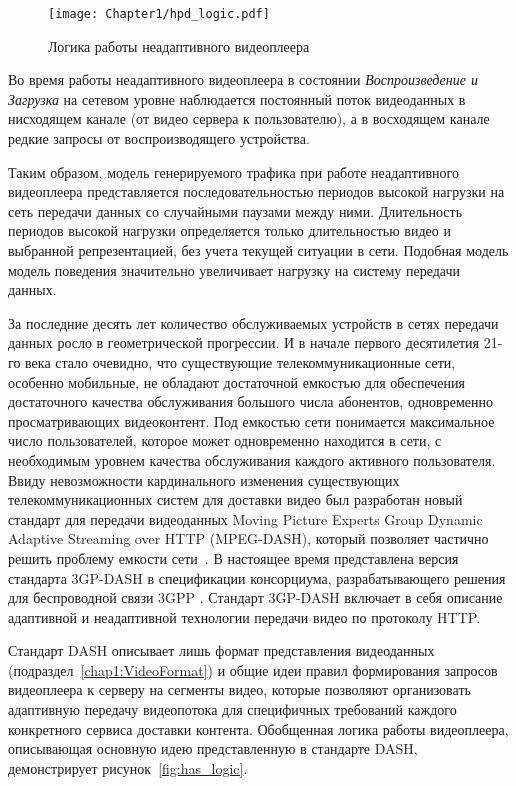 \begin{figure}[htbp]
\begin{center}
\texttt{[image: Chapter1/hpd\_logic.pdf]}
\caption{Логика работы неадаптивного видеоплеера}
\label{fig:hpd_logic}
\end{center}
\end{figure}

Во время работы неадаптивного видеоплеера в состоянии \textit{Воспроизведение и Загрузка} на сетевом уровне наблюдается постоянный поток видеоданных в нисходящем канале (от видео сервера к пользователю), а в восходящем канале редкие запросы от воспроизводящего устройства.

Таким образом, модель генерируемого трафика при работе неадаптивного видеоплеера представляется последовательностью периодов высокой нагрузки на сеть передачи данных со случайными паузами между ними. Длительность периодов высокой нагрузки определяется только длительностью видео и выбранной репрезентацией, без учета текущей ситуации в сети. Подобная модель модель поведения значительно увеличивает нагрузку на систему передачи данных.

За последние десять лет количество обслуживаемых устройств в сетях передачи данных росло в геометрической прогрессии. И в начале первого десятилетия 21-го века стало очевидно, что существующие телекоммуникационные сети, особенно мобильные, не обладают достаточной емкостью для обеспечения достаточного качества обслуживания большого числа абонентов, одновременно просматривающих видеоконтент. Под емкостью сети понимается максимальное число пользователей, которое может одновременно находится в сети, с необходимым уровнем качества обслуживания каждого активного пользователя. Ввиду невозможности кардинального изменения существующих телекоммуникационных систем для доставки видео был разработан новый стандарт для передачи видеоданных Moving Picture Experts Group Dynamic Adaptive Streaming over HTTP (MPEG-DASH), который позволяет частично решить проблему емкости сети~\cite{dash_standard}. В настоящее время представлена версия стандарта 3GP-DASH в спецификации консорциума, разрабатывающего решения для беспроводной связи 3GPP \cite{conviva}. Стандарт 3GP-DASH включает в себя описание адаптивной и неадаптивной технологии передачи видео по протоколу HTTP.

Стандарт DASH описывает лишь формат представления видеоданных (подраздел~\ref{chap1:VideoFormat}) и общие идеи правил формирования запросов видеоплеера к серверу на сегменты видео, которые позволяют организовать адаптивную передачу видеопотока для специфичных требований каждого конкретного сервиса доставки контента. Обобщенная логика работы видеоплеера, описывающая основную идею представленную в стандарте DASH, демонстрирует рисунок~\ref{fig:has_logic}.

